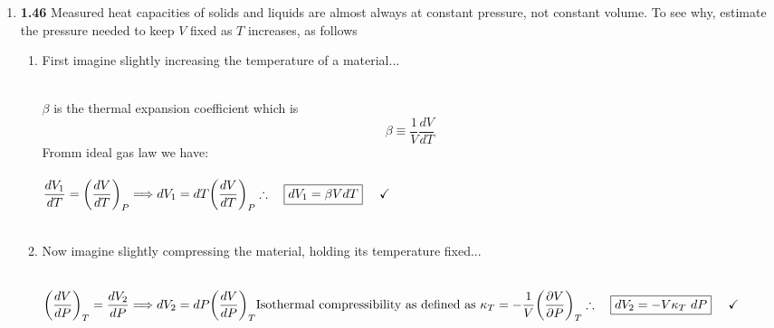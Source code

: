 \documentclass[fleqn]{article}
\begin{document}
  \begin{enumerate}
    \item \textbf{1.46} Measured heat capacities of solids and liquids are almost always at constant  pressure,
    not constant volume. To see why, estimate the pressure needed to keep $V$ fixed as $T$ increases, as follows

    \begin{enumerate}
      \item First imagine slightly increasing the temperature of a material...

        \textcolor{hwColor}{
          \\
          $\beta$ is the thermal expansion coefficient which is 
          $$
            \beta \equiv \dfrac{1}{V} \dfrac{dV}{dT}
          $$
          Fromm ideal gas law we have:
          \\
          \\
          $
            \dfrac{dV_1}{dT}=\bigg( \dfrac{dV}{dT} \bigg)_P
            \Longrightarrow dV_1=dT \bigg( \dfrac{dV}{dT} \bigg)_P
            \\
            \\
            \\
            \therefore ~~~ \boxed{
              dV_1=\beta V dT
            } ~~~~ \checkmark
          $
          \\
          \\
        }

      \item Now imagine slightly compressing the material, holding its temperature fixed...

        \textcolor{hwColor}{
          \\
          $
            \bigg( \dfrac{dV}{dP} \bigg)_T=\dfrac{dV_2}{dP}
            \Longrightarrow dV_2=dP \bigg( \dfrac{dV}{dP} \bigg)_T
            \\
            \\
            \\
            \text{Isothermal compressibility as defined as }
            \\
            \\
            \kappa_T=-\dfrac{1}{V} \bigg( \dfrac{\partial V}{\partial P} \bigg)_T
            \\
            \\
            \\
            \therefore ~~~ \boxed{
              dV_2=-V \kappa_T ~ dP
            } ~~~~ \checkmark
            \\
            \\
          $
        }


\end{enumerate}
\end{enumerate}
\end{document}
